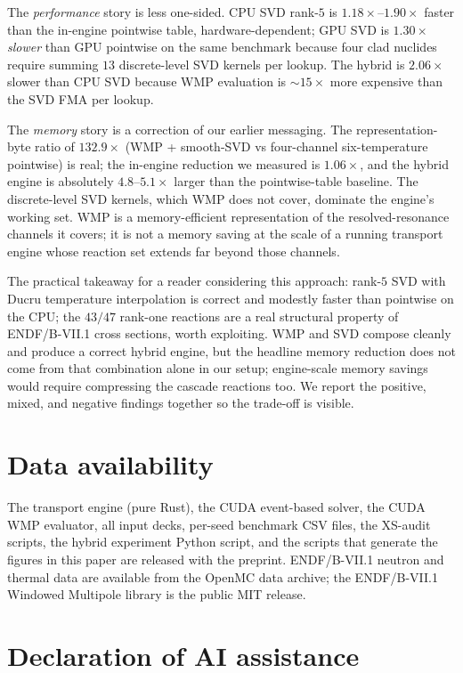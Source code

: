 \documentclass[11pt,a4paper]{article}
\begin{document}
The \emph{performance} story is less one-sided.
CPU SVD rank-$5$ is $1.18\times$--$1.90\times$ faster than
the in-engine pointwise table, hardware-dependent;
GPU SVD is $1.30\times$ \emph{slower} than GPU pointwise on
the same benchmark because four clad nuclides require
summing $13$ discrete-level SVD kernels per lookup.
The hybrid is $2.06\times$ slower than CPU SVD because
WMP evaluation is $\sim\!15\times$ more expensive than the
SVD FMA per lookup.

The \emph{memory} story is a correction of our earlier
messaging. The representation-byte ratio of
$132.9\times$ (WMP + smooth-SVD vs four-channel
six-temperature pointwise) is real; the in-engine
reduction we measured is $1.06\times$, and the hybrid
engine is absolutely $4.8$--$5.1\times$ larger than the
pointwise-table baseline. The discrete-level SVD kernels,
which WMP does not cover, dominate the engine's working
set. WMP is a memory-efficient representation of the
resolved-resonance channels it covers; it is not a memory
saving at the scale of a running transport engine whose
reaction set extends far beyond those channels.

The practical takeaway for a reader considering this
approach: rank-$5$ SVD with Ducru temperature interpolation
is correct and modestly faster than pointwise on the CPU;
the $43/47$ rank-one reactions are a real
structural property of ENDF/B-VII.1 cross sections, worth
exploiting. WMP and SVD compose cleanly and produce a
correct hybrid engine, but the headline memory reduction
does not come from that combination alone in our setup;
engine-scale memory savings would require compressing the
cascade reactions too. We report the positive, mixed, and
negative findings together so the trade-off is visible.

\section*{Data availability}

The transport engine (pure Rust), the CUDA event-based solver,
the CUDA WMP evaluator, all input decks, per-seed benchmark
CSV files, the XS-audit scripts, the hybrid experiment Python
script, and the scripts that generate the figures in this
paper are released with the preprint. ENDF/B-VII.1 neutron
and thermal data are available from the OpenMC data archive;
the ENDF/B-VII.1 Windowed Multipole library is the public
MIT release.

\section*{Declaration of AI assistance}
\end{document}
